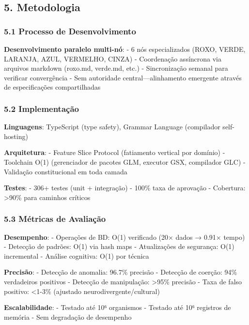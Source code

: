 \documentclass[
]{article}
\begin{document}
\subsection{5. Metodologia}\label{metodologia}

\subsubsection{5.1 Processo de
Desenvolvimento}\label{processo-de-desenvolvimento}

\textbf{Desenvolvimento paralelo multi-nó}: - 6 nós especializados
(ROXO, VERDE, LARANJA, AZUL, VERMELHO, CINZA) - Coordenação assíncrona
via arquivos markdown (roxo.md, verde.md, etc.) - Sincronização semanal
para verificar convergência - Sem autoridade central---alinhamento
emergente através de especificações compartilhadas

\subsubsection{5.2 Implementação}\label{implementauxe7uxe3o}

\textbf{Linguagens}: TypeScript (type safety), Grammar Language
(compilador self-hosting)

\textbf{Arquitetura}: - Feature Slice Protocol (fatiamento vertical por
domínio) - Toolchain O(1) (gerenciador de pacotes GLM, executor GSX,
compilador GLC) - Validação constitucional em toda camada

\textbf{Testes}: - 306+ testes (unit + integração) - 100\% taxa de
aprovação - Cobertura: \textgreater90\% para caminhos críticos

\subsubsection{5.3 Métricas de
Avaliação}\label{muxe9tricas-de-avaliauxe7uxe3o}

\textbf{Desempenho}: - Operações de BD: O(1) verificado (20× dados →
0.91× tempo) - Detecção de padrões: O(1) via hash maps - Atualizações de
segurança: O(1) incremental - Análise cognitiva: O(1) por técnica

\textbf{Precisão}: - Detecção de anomalia: 96.7\% precisão - Detecção de
coerção: 94\% verdadeiros positivos - Detecção de manipulação:
\textgreater95\% precisão - Taxa de falso positivo: \textless1-3\%
(ajustado neurodivergente/cultural)

\textbf{Escalabilidade}: - Testado até 10⁶ organismos - Testado até 10⁶
registros de memória - Sem degradação de desempenho
\end{document}
